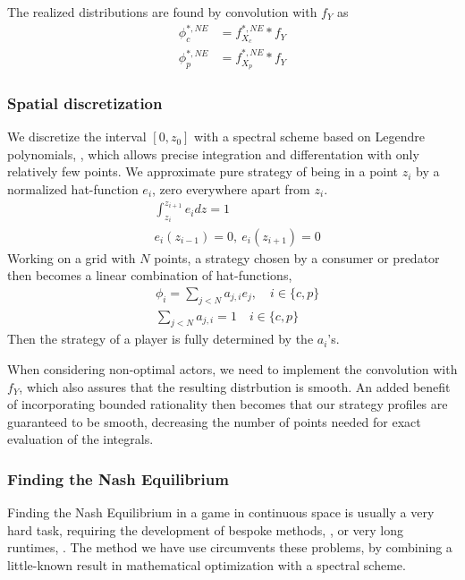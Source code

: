 The realized distributions are found by convolution with $f_Y$ as
\begin{align}
  \phi_c^{*,NE} &= f_{X_c}^{*,NE} * f_Y \\
  \phi_p^{*,NE} &= f_{X_p}^{*,NE} * f_Y
\end{align}

\subsubsection*{Spatial discretization}
We discretize the interval $[0,z_0]$ with a spectral scheme based on Legendre polynomials, \citep{kopriva2009implementing}, which allows precise integration and differentation with only relatively few points.
We approximate pure strategy of being in a point $z_i$  by a normalized hat-function $e_i$, zero everywhere apart from $z_i$.
\begin{align}
	& \int_{z_i}^{z_{i+1}} e_i dz = 1 \\
	&e_i(z_{i-1}) = 0,~ e_i(z_{i+1}) = 0
\end{align}
Working on a grid with $N$ points, a strategy chosen by a consumer or predator then becomes a linear combination of hat-functions,
\begin{align}
  &\phi_{i} = \sum_{j<N} a_{j,i} e_j, \quad i\in \{c,p\} \\
  &\sum_{j<N} a_{j,i} = 1 \quad i\in \{c,p\}
\end{align}
Then the strategy of a player is fully determined by the $a_i$'s.

When considering non-optimal actors, we need to implement the convolution with $f_Y$, which also assures that the resulting distrbution is smooth. An added benefit of incorporating bounded rationality then becomes that our strategy profiles are guaranteed to be smooth, decreasing the number of points needed for exact evaluation of the integrals.


\subsubsection*{Finding the Nash Equilibrium}
Finding the Nash Equilibrium in a game in continuous space is usually a very hard task, requiring the development of bespoke methods, \citep{verticalmigration}, or very long runtimes, \citep{jerome}. The method we have use circumvents these problems, by combining a little-known result in mathematical optimization with a spectral scheme.

